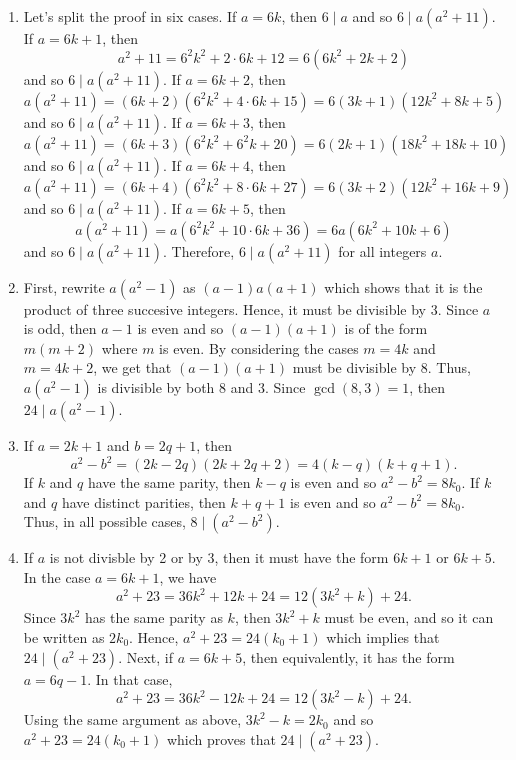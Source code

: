 \begin{solution}
    \begin{enumerate}
        \item Let's split the proof in six cases. If $a = 6k$, then $6 \mid a$ and so $6 \mid a(a^2 + 11)$. If $a = 6k+1$, then
        $$a^2 + 11 = 6^2k^2 + 2 \cdot 6k + 12 = 6(6k^2 + 2k + 2)$$
        and so $6\mid a(a^2 + 11)$. If $a = 6k+2$, then 
        $$a(a^2 + 11) = (6k+2)(6^2k^2 + 4\cdot 6k + 15) = 6(3k+1)(12k^2 + 8k + 5)$$
        and so $6\mid a(a^2 + 11)$. If $a = 6k+3$, then 
        $$a(a^2 + 11) = (6k+3)(6^2k^2 + 6^2k + 20) = 6(2k+1)(18k^2 + 18k + 10)$$
        and so $6\mid a(a^2 + 11)$. If $a = 6k+4$, then 
        $$a(a^2 + 11) = (6k+4)(6^2k^2 + 8\cdot 6k + 27) = 6(3k+2)(12k^2 + 16k + 9)$$
        and so $6\mid a(a^2 + 11)$. If $a = 6k+5$, then 
        $$a(a^2 + 11) = a(6^2k^2 + 10\cdot 6k + 36) = 6a(6k^2 + 10k + 6)$$
        and so $6\mid a(a^2 + 11)$. Therefore, $6 \mid a(a^2 + 11)$ for all integers $a$.
        \item First, rewrite $a(a^2 - 1)$ as $(a-1)a(a+1)$ which shows that it is the product of three succesive integers. Hence, it must be divisible by 3. Since $a$ is odd, then $a-1$ is even and so $(a-1)(a+1)$ is of the form $m(m+2)$ where $m$ is even. By considering the cases $m = 4k$ and $m = 4k+2$, we get that $(a-1)(a+1)$ must be divisible by 8. Thus, $a(a^2 - 1)$ is divisible by both 8 and 3. Since $\gcd(8, 3) = 1$, then $24 \mid a(a^2 - 1)$.
        \item If $a = 2k+1$ and $b = 2q+1$, then
        $$a^2 - b^2 = (2k - 2q)(2k + 2q + 2) = 4(k - q)(k + q + 1).$$
        If $k$ and $q$ have the same parity, then $k - q$ is even and so $a^2 - b^2 = 8k_0$. If $k$ and $q$ have distinct parities, then $k + q + 1$ is even and so $a^2 - b^2 = 8k_0$. Thus, in all possible cases, $8 \mid (a^2 - b^2)$.
        \item If $a$ is not divisble by 2 or by 3, then it must have the form $6k+1$ or $6k + 5$. In the case $a = 6k + 1$, we have 
        $$a^2 + 23 = 36k^2 + 12k + 24 = 12(3k^2 + k) + 24.$$
        Since $3k^2$ has the same parity as $k$, then $3k^2 + k$ must be even, and so it can be written as $2k_0$. Hence, $a^2 + 23 = 24(k_0 + 1)$ which implies that $24 \mid (a^2 + 23)$. Next, if $a = 6k + 5$, then equivalently, it has the form $a = 6q - 1$. In that case,
        $$a^2 + 23 = 36k^2 - 12k + 24 = 12(3k^2 - k) + 24.$$
        Using the same argument as above, $3k^2 - k = 2k_0$ and so $a^2 + 23 = 24(k_0 + 1)$ which proves that $24 \mid (a^2 + 23)$.
    \end{enumerate}
\end{solution}

